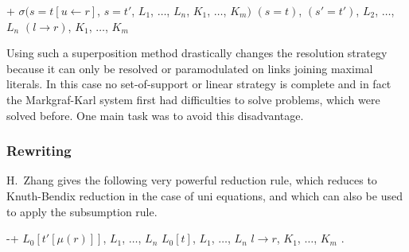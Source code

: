 \begin{Def}
\return\vspace{-3mm}
\label{MergingSuperposition}

\hlineblocktwo%
{+}%
{$\sigma(s = t[u\leftarrow r]$, $s = t'$, $L_1$, $\dots$, $L_n$, $K_1$,
$\dots$, $K_m)$}%
{$(s = t)$, $(s' = t')$, $L_2$, $\dots$, $L_n$}%
{$(l \rightarrow r)$, $K_1$, $\dots$, $K_m$}
\end{Def}
Using such a superposition method drastically changes the resolution strategy
because it can only be resolved or paramodulated on links joining 
maximal literals. In this case no set-of-support or linear strategy is complete
and in fact the Markgraf-Karl system
first had difficulties to solve problems, which were
solved before. One main task was to avoid this disadvantage.

\subsubsection{Rewriting}

H.\ Zhang \cite{Zhang88} gives the following very powerful reduction rule, 
which reduces to Knuth-Bendix reduction in the case of uni equations, and 
which can also be used to apply the subsumption rule.

\begin{Def}
\return\vspace{-3mm}
\label{ContextualRewriting}

\hlineblocktwo%
{-+}%
{$L_0[t'[\mu(r)]]$, $L_1$, $\dots$, $L_n$}%
{$L_0[t]$, $L_1$, $\dots$, $L_n$}%
{$l \rightarrow r$, $K_1$, $\dots$, $K_m$}
.
\end{Def}

